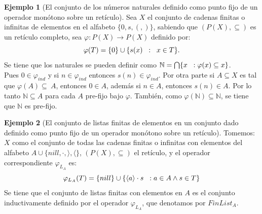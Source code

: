 \documentclass[11pt,oneside]{report}
\theoremstyle{plain}
\theoremstyle{definition}
\newtheorem{ejemplo}{Ejemplo}[chapter]
\newcommand{\N}{\mathbb{N}}
\begin{document}
\begin{ejemplo}[El conjunto de los números naturales definido como punto fijo de un operador monótono sobre un retículo]
    Sea $X$ el conjunto de cadenas finitas o infinitas de elementos en el alfabeto $\{0, s, (, )\} $, sabiendo que $(P(X), \subseteq)$ es un retículo completo, sea $\varphi:P(X)\longrightarrow P(X)$ definido por:
    $$\varphi(T)=\{0\} \cup \{s(x)\hspace{2mm}:\hspace{2mm}x\in T\}.$$
    Se tiene que los naturales se pueden definir como
    $\N=\bigcap \{x \hspace{2mm}: \varphi(x)\subseteq x\}$.\\
    Pues $0\in \varphi_{ind}$ y si $n\in \varphi_{ind}$ entonces $s(n) \in \varphi_{ind}$. Por otra parte si $A\subseteq X$ es tal que $\varphi(A)\subseteq\ A$, entonces $0\in A$, además si $n\in A$, entonces $s(n) \in A$. Por lo tanto $\N \subseteq A$ para cada $A$ pre-fijo bajo $\varphi$. También, como $\varphi(\N) \subseteq \N$, se tiene que $\N$ es pre-fijo.

\end{ejemplo}

\begin{ejemplo}[El conjunto de listas finitas de elementos en un conjunto dado definido como punto fijo de un operador monótono sobre un retículo]
    Tomemos:
    $X$ como el conjunto de todas las cadenas finitas o infinitas con elementos del alfabeto $A\cup\{nill, \cdot, \rangle, \langle\}$, $(P(X),\subseteq)$ el retículo, y el operador correspondiente $\varphi_{L_A}$ es:
    $$\varphi_{L_A}(T) = \{ nill\} \cup \{\langle a\rangle \cdot s \hspace{2mm}: a\in A \land s \in T \}$$
    Se tiene que el conjunto de listas finitas con elementos en $A$ es el conjunto inductivamente definido por el operador $\varphi_{L_A}$, que denotamos por $FinList_{A}$. %
\end{ejemplo}
\end{document}
